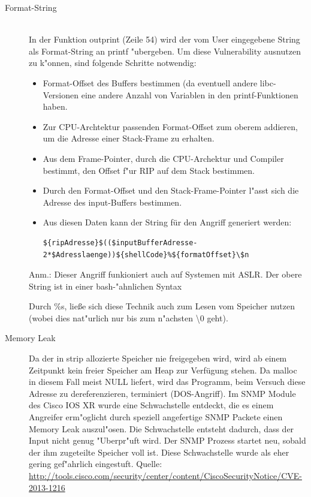 \documentclass[12pt,a4paper,titlepage,oneside]{scrartcl}
\begin{document}
\begin{description}
  \item[Format-String] \hfill \\
  In der Funktion outprint (Zeile 54) wird der vom User eingegebene String als Format-String an printf "ubergeben.
    Um diese Vulnerability ausnutzen zu k"onnen, sind folgende Schritte notwendig:
    \begin{itemize}
        \item Format-Offset des Buffers bestimmen (da eventuell andere libc-Versionen eine andere Anzahl von Variablen in den printf-Funktionen haben.
        \item Zur CPU-Archtektur passenden Format-Offset zum oberem addieren, um die Adresse einer Stack-Frame zu erhalten.
        \item Aus dem Frame-Pointer, durch die CPU-Archektur und Compiler bestimmt, den Offset f"ur RIP auf dem Stack bestimmen.
        \item Durch den Format-Offset und den Stack-Frame-Pointer l"asst sich die Adresse des input-Buffers bestimmen.
        \item Aus diesen Daten kann der String für den Angriff generiert werden:\\
        \begin{lstlisting}
${ripAdresse}$(($inputBufferAdresse-2*$Adresslaenge))${shellCode}%${formatOffset}\$n
        \end{lstlisting}
    \end{itemize}
    Anm.: Dieser Angriff funkioniert auch auf Systemen mit ASLR. Der obere String ist in einer bash-"ahnlichen Syntax
    
    Durch \%s, ließe sich diese Technik auch zum Lesen vom Speicher nutzen (wobei dies nat"urlich nur bis zum n"achsten \textbackslash0 geht).\newline

    \item[Memory Leak]
    Da der in strip allozierte Speicher nie freigegeben wird, wird ab einem Zeitpunkt kein freier Speicher am Heap zur Verfügung stehen. Da malloc in diesem Fall meist NULL liefert, wird das Programm, beim Versuch diese Adresse zu dereferenzieren, terminiert (DOS-Angriff).\newline
    Im SNMP Module des Cisco IOS XR wurde eine Schwachstelle entdeckt, die es einem Angreifer erm"oglicht durch speziell angefertige SNMP Packete einen Memory Leak auszul"osen. Die Schwachstelle entsteht dadurch, dass der Input nicht genug "Uberpr"uft wird. Der SNMP Prozess startet neu, sobald der ihm zugeteilte Speicher voll ist. Diese Schwachstelle wurde als eher gering gef"ahrlich eingestuft.\newline
    Quelle: \url{http://tools.cisco.com/security/center/content/CiscoSecurityNotice/CVE-2013-1216}
\end{description}
\end{document}
